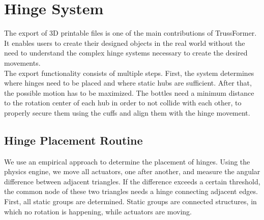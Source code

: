 \section{Hinge System}
The export of 3D printable files is one of the main contributions of TrussFormer. It enables users to create their designed objects in the real world without the need to understand the complex hinge systems necessary to create the desired movements.\\
The export functionality consists of multiple steps. First, the system determines where hinges need to be placed and where static hubs are sufficient. After that, the possible motion has to be maximized. The bottles need a minimum distance to the rotation center of each hub in order to not collide with each other, to properly secure them using the cuffs and align them with the hinge movement.

\subsection{Hinge Placement Routine}\label{sec:hinge_placement_impl}
We use an empirical approach to determine the placement of hinges. Using the physics engine, we move all actuators, one after another, and measure the angular difference between adjacent triangles. If the difference exceeds a certain threshold, the common node of these two triangles needs a hinge connecting adjacent edges.\\
First, all static groups are determined. Static groups are connected structures, in which no rotation is happening, while actuators are moving.

